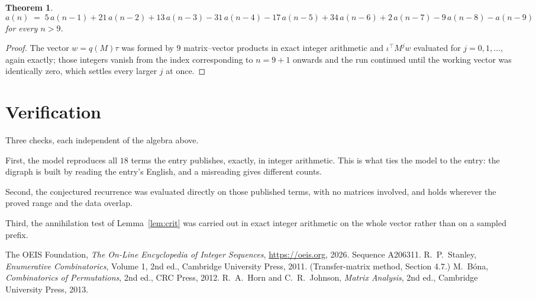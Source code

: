 \documentclass[11pt,a4paper]{article}
\theoremstyle{plain}
\newtheorem{theorem}{Theorem}
\theoremstyle{definition}
\begin{document}
\begin{theorem}
\[
a(n)\;=\;5\,a(n-1) + 21\,a(n-2) + 13\,a(n-3) - 31\,a(n-4) - 17\,a(n-5) + 34\,a(n-6) + 2\,a(n-7) - 9\,a(n-8) - a(n-9)
\]
for every $n>9$.
\end{theorem}

\begin{proof}
The vector $w=q(M)\tau$ was formed by $9$ matrix--vector products in exact integer
arithmetic and $\iota^{\!\top}M^{j}w$ evaluated for $j=0,1,\dots$, again exactly; those
integers vanish from the index corresponding to $n=9+1$ onwards and the run continued
until the working vector was identically zero, which settles every larger $j$ at once.
\end{proof}

\section{Verification}

Three checks, each independent of the algebra above.

First, the model reproduces all $18$ terms the entry publishes, exactly, in integer
arithmetic. This is what ties the model to the entry: the digraph is built by reading the
entry's English, and a misreading gives different counts.

Second, the conjectured recurrence was evaluated directly on those published terms, with no
matrices involved, and holds wherever the proved range and the data overlap.

Third, the annihilation test of Lemma~\ref{lem:crit} was carried out in exact integer
arithmetic on the whole vector rather than on a sampled prefix.

\begin{thebibliography}{9}
 The OEIS Foundation, \emph{The On-Line Encyclopedia of Integer
Sequences}, \url{https://oeis.org}, 2026. Sequence A206311.
 R.~P.~Stanley, \emph{Enumerative Combinatorics}, Volume 1, 2nd ed.,
Cambridge University Press, 2011. (Transfer-matrix method, Section 4.7.)
 M.~B\'ona, \emph{Combinatorics of Permutations}, 2nd ed., CRC
Press, 2012.
 R.~A.~Horn and C.~R.~Johnson, \emph{Matrix Analysis}, 2nd ed., Cambridge
University Press, 2013.
\end{thebibliography}
\end{document}

